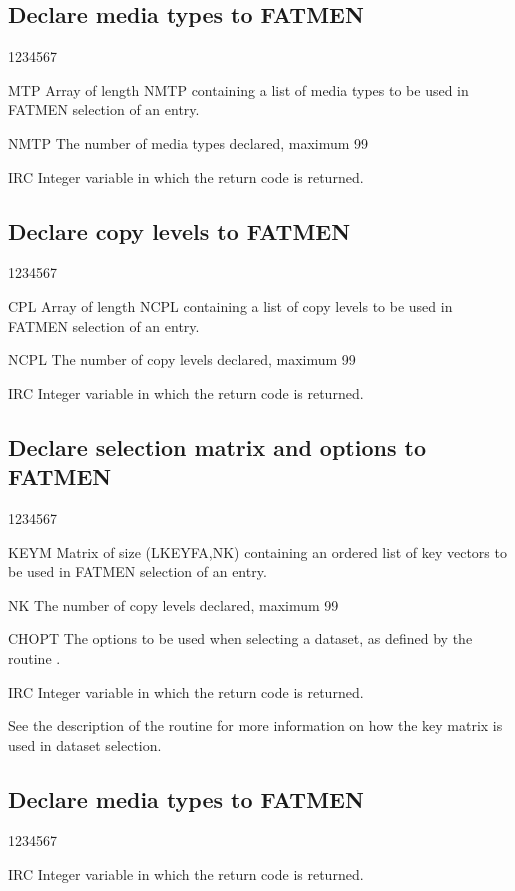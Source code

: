 \subsection{Declare media types to FATMEN}
\begin{DLtt}{1234567}
\item[MTP]
Array of length NMTP containing a list of media types
to be used in FATMEN selection of an entry.
\item[NMTP]
The number of media types declared, maximum 99
\item[IRC]
Integer variable in which the return code is returned.
\end{DLtt}
\subsection{Declare copy levels to FATMEN}
\begin{DLtt}{1234567}
\item[CPL]
Array of length NCPL containing a list of copy levels
to be used in FATMEN selection of an entry.
\item[NCPL]
The number of copy levels declared, maximum 99
\item[IRC]
Integer variable in which the return code is returned.
\end{DLtt}
\subsection{Declare selection matrix and options to FATMEN}
\begin{DLtt}{1234567}
\item[KEYM]
Matrix of size (LKEYFA,NK) containing an ordered
list of key vectors 
to be used in FATMEN selection of an entry.
\item[NK]
The number of copy levels declared, maximum 99
\item[CHOPT]
The options to be used when selecting a dataset,
as defined by the routine .
\item[IRC]
Integer variable in which the return code is returned.
\end{DLtt}

See the description of the  routine for more information
on how the key matrix is used in dataset selection.

\subsection{Declare media types to FATMEN}
\begin{DLtt}{1234567}
\item[IRC]
Integer variable in which the return code is returned.
\end{DLtt}

